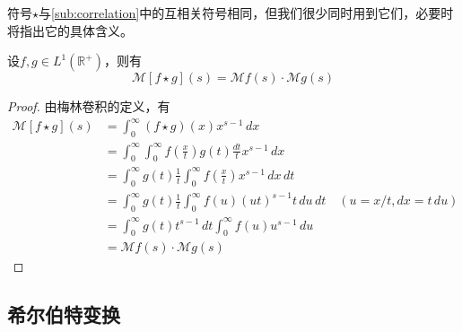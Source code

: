 \documentclass{ctexbook}
\begin{document}
符号$\star$与\ref{sub:correlation}中的互相关符号相同，但我们很少同时用到它们，必要时将指出它的具体含义。


\begin{proposition}[梅林卷积的变换性质]
    设$f,g\in L^1(\mathbb{R}^+)$，则有
    \[\mathcal{M} [f\star g](s)=\mathcal{M} f(s)\cdot \mathcal{M} g(s)\]
\end{proposition}
\begin{proof}
    由梅林卷积的定义，有
    \begin{align*}
        \mathcal{M} [f\star g](s)&=\int_0^{\infty}(f\star g)(x)x^{s-1}\,dx\\
        &=\int_0^{\infty}\int_0^{\infty}f\left(\frac{x}{t}\right)g(t)\frac{dt}{t}x^{s-1}\,dx\\
        &=\int_0^{\infty}g(t)\frac{1}{t}\int_0^{\infty}f\left(\frac{x}{t}\right)x^{s-1}\,dx\,dt\\
        &=\int_0^{\infty}g(t)\frac{1}{t}\int_0^{\infty}f(u)(ut)^{s-1}t\,du\,dt\quad (u=x/t,dx=t\,du)\\
        &=\int_0^{\infty}g(t)t^{s-1}\,dt\int_0^{\infty}f(u)u^{s-1}\,du\\
        &=\mathcal{M} f(s)\cdot \mathcal{M} g(s)
    \end{align*}
\end{proof}

\subsection{希尔伯特变换}\label{sub:hilbert}
\end{document}
